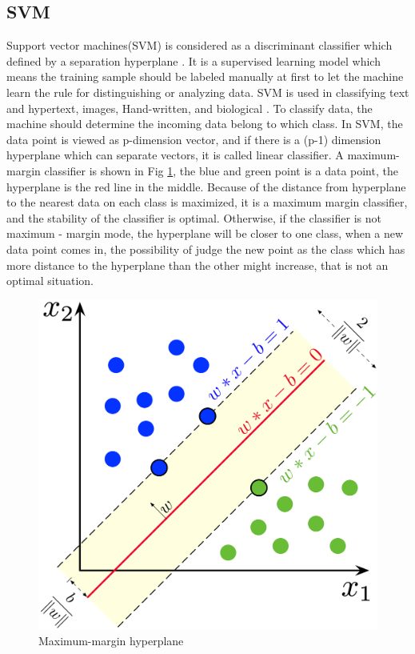 \documentclass[a4paper,12pt]{article}
\begin{document}
\subsection{SVM}
Support vector machines(SVM) is considered as a discriminant classifier which defined by a separation hyperplane \autocite{patel_2019}. It is a supervised learning model which means the training sample should be labeled manually at first to let the machine learn the rule for distinguishing or analyzing data. SVM is used in classifying text and hypertext, images, Hand-written, and biological \autocite{wiki:svm}. To classify data, the machine should determine the incoming data belong to which class. In SVM, the data point is viewed as p-dimension vector, and if there is a (p-1) dimension hyperplane which can separate vectors, it is called linear classifier. A maximum-margin classifier is shown in Fig \ref{fig:svm_liner}, the blue and green point is a data point, the hyperplane is the red line in the middle. Because of the distance from hyperplane to the nearest data on each class is maximized, it is a maximum margin classifier, and the stability of the classifier is optimal. Otherwise, if the classifier is not maximum - margin mode, the hyperplane will be closer to one class, when a new data point comes in, the possibility of judge the new point as the class which has more distance to the hyperplane than the other might increase, that is not an optimal situation.

\begin{figure}[H]
\centering
\includegraphics[width = .8\textwidth]{SVM_margin.png}
\caption{Maximum-margin hyperplane \autocite{wiki:svm}}
\label{fig:svm_liner}
\end{figure}
\end{document}
